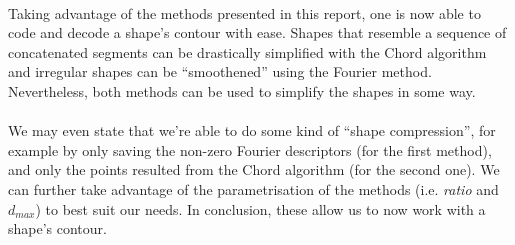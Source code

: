 \paragraph{}
Taking advantage of the methods presented in this report, one is now able to code and decode a shape's contour with ease.
Shapes that resemble a sequence of concatenated segments can be drastically simplified with the Chord algorithm and irregular shapes can be ``smoothened'' using the Fourier method.
Nevertheless, both methods can be used to simplify the shapes in some way.
\paragraph{}
We may even state that we're able to do some kind of ``shape compression'', for example by only saving the non-zero Fourier descriptors (for the first method), and only the points resulted from the Chord algorithm (for the second one).
We can further take advantage of the parametrisation of the methods (i.e. \emph{ratio} and $d_{max}$) to best suit our needs.
In conclusion, these allow us to now work with a shape's contour.